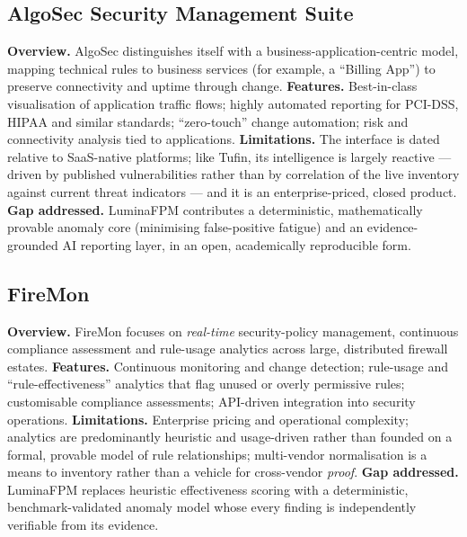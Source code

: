 \subsection{AlgoSec Security Management Suite}
\textbf{Overview.} AlgoSec distinguishes itself with a business-application-centric model, mapping technical rules to business services (for example, a ``Billing App'') to preserve connectivity and uptime through change.
\textbf{Features.} Best-in-class visualisation of application traffic flows; highly automated reporting for PCI-DSS, HIPAA and similar standards; ``zero-touch'' change automation; risk and connectivity analysis tied to applications.
\textbf{Limitations.} The interface is dated relative to SaaS-native platforms; like Tufin, its intelligence is largely reactive --- driven by published vulnerabilities rather than by correlation of the live inventory against current threat indicators --- and it is an enterprise-priced, closed product.
\textbf{Gap addressed.} LuminaFPM contributes a deterministic, mathematically provable anomaly core (minimising false-positive fatigue) and an evidence-grounded AI reporting layer, in an open, academically reproducible form.

\subsection{FireMon}
\textbf{Overview.} FireMon focuses on \emph{real-time} security-policy management, continuous compliance assessment and rule-usage analytics across large, distributed firewall estates.
\textbf{Features.} Continuous monitoring and change detection; rule-usage and ``rule-effectiveness'' analytics that flag unused or overly permissive rules; customisable compliance assessments; API-driven integration into security operations.
\textbf{Limitations.} Enterprise pricing and operational complexity; analytics are predominantly heuristic and usage-driven rather than founded on a formal, provable model of rule relationships; multi-vendor normalisation is a means to inventory rather than a vehicle for cross-vendor \emph{proof}.
\textbf{Gap addressed.} LuminaFPM replaces heuristic effectiveness scoring with a deterministic, benchmark-validated anomaly model whose every finding is independently verifiable from its evidence.

